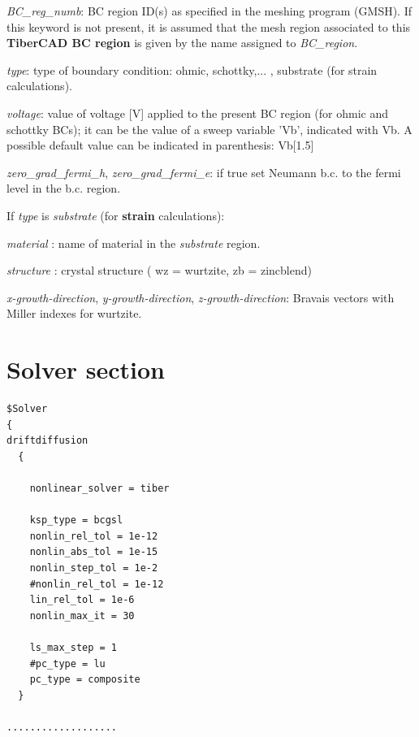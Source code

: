 \textit{ BC\_reg\_numb}:  BC region ID(s) as  specified in the meshing  program (GMSH). If  this  keyword  is  not  present, it  is  assumed  that the  mesh region associated to  this  \textbf{TiberCAD BC region} is  given by the  name assigned  to   \textit{BC\_region}.

\textit{ type}: type of  boundary condition: ohmic,  schottky,...  ,  substrate (for strain calculations).

\textit{ voltage}:  value of voltage [V] applied to the present BC region (for ohmic and  schottky BCs); it can be the  value of a sweep  variable 'Vb', indicated with  Vb. A possible default value can be indicated in parenthesis:  Vb[1.5]

\textit{ zero\_grad\_fermi\_h}, \textit{ zero\_grad\_fermi\_e}: if true set  Neumann b.c. to the fermi level in the b.c. region.

If \textit{type} is \textsl{substrate} (for \textbf{strain} calculations):

\textit{material} : name of  material in the \textsl{substrate}  region. 

\textit{structure} : crystal structure ( wz = wurtzite,  zb =  zincblend)

\textit{x-growth-direction}, \textit{y-growth-direction}, \textit{z-growth-direction}: Bravais  vectors with Miller  indexes for  wurtzite.




\section{Solver section }

\label{section:solver}

\begin{inputfile}
\begin{verbatim}
$Solver
{ 
driftdiffusion
  {

    nonlinear_solver = tiber

    ksp_type = bcgsl
    nonlin_rel_tol = 1e-12
    nonlin_abs_tol = 1e-15
    nonlin_step_tol = 1e-2
    #nonlin_rel_tol = 1e-12
    lin_rel_tol = 1e-6
    nonlin_max_it = 30
    
    ls_max_step = 1
    #pc_type = lu
    pc_type = composite
  }

...................

\end{verbatim}
\end{inputfile}


